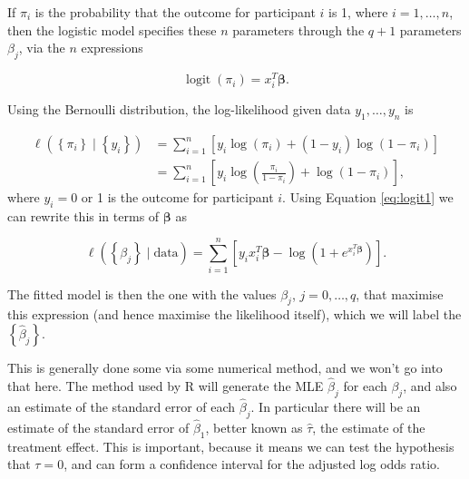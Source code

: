 \documentclass[
  openany]{book}
\theoremstyle{definition}
\theoremstyle{definition}
\theoremstyle{definition}
\theoremstyle{definition}
\theoremstyle{remark}
\begin{document}
If \(\pi_i\) is the probability that the outcome for participant \(i\) is 1, where \(i=1,\ldots,n\), then the logistic model specifies these \(n\) parameters through the \(q+1\) parameters \(\beta_j\), via the \(n\) expressions

\begin{equation}
\operatorname{logit}\left(\pi_i\right) = x_i^T\boldsymbol\beta.
\label{eq:logit1}
\end{equation}

Using the Bernoulli distribution, the log-likelihood given data \(y_1,\ldots,y_n\) is

\begin{align*}
\ell\left(\left\lbrace\pi_i \right\rbrace \mid\left\lbrace y_i\right\rbrace\right) & = \sum\limits_{i=1}^n\left[y_i\log(\pi_i) + \left(1-y_i\right)\log\left(1-\pi_i\right)\right]\\
& = \sum\limits_{i=1}^n\left[y_i\log\left(\frac{\pi_i}{1-\pi_i}\right) + \log\left(1-\pi_i\right)\right],
\end{align*}
where \(y_i=0\) or 1 is the outcome for participant \(i\). Using Equation \eqref{eq:logit1} we can rewrite this in terms of \(\boldsymbol\beta\) as

\[\ell\left(\left\lbrace\beta_j \right\rbrace\mid{\text{data}}\right) = \sum\limits_{i=1}^n \left[y_i x_i^T\boldsymbol\beta - \log\left(1+e^{x_i^T\boldsymbol\beta}\right)\right].\]

The fitted model is then the one with the values \(\beta_j\), \(j=0,\dots,q\), that maximise this expression (and hence maximise the likelihood itself), which we will label the \(\left\lbrace \hat{\beta}_j\right\rbrace\).

This is generally done some via some numerical method, and we won't go into that here. The method used by R will generate the MLE \(\hat\beta_j\) for each \(\beta_j\), and also an estimate of the standard error of each \(\hat\beta_j\). In particular there will be an estimate of the standard error of \(\hat\beta_1\), better known as \(\hat\tau\), the estimate of the treatment effect. This is important, because it means we can test the hypothesis that \(\tau=0\), and can form a confidence interval for the adjusted log odds ratio.
\end{document}
